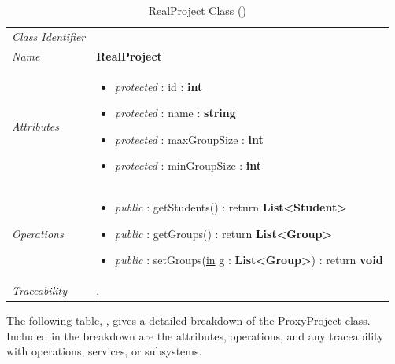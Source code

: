 \documentclass[12pt,letterpaper]{article}
\begin{document}
\begin{table}[H]
    \caption{RealProject Class ()} 
	\begin{tabu} to 
		\toprule
		Class Identifier &  \\
		Name & {\bf RealProject} \\
		Attributes & 
		\begin{minipage}[t]{\linewidth}
		    \begin{itemize}
		        \item \textit{protected} : id : {\bf int}
		        \item \textit{protected} : name : {\bf string}
		        \item \textit{protected} : maxGroupSize : {\bf int}
		        \item \textit{protected} : minGroupSize : {\bf int}
			\end{itemize}
	    \end{minipage} \\

		Operations &
		\begin{minipage}[t]{\linewidth}
			\begin{itemize}
			    \item {\it public} : getStudents() : return {\bf List<Student>}
			    \item {\it public} : getGroups() : return {\bf List<Group>}
			    \item {\it public} : setGroups(\underline{in} g : {\bf List<Group>}) : return {\bf void}
	        \end{itemize}
	    \end{minipage} \\
	    	Traceability & , \\
		\toprule
	\end{tabu}
\end{table}

\newpage{}
The following table, , gives a detailed breakdown of the ProxyProject class. Included in the breakdown are the attributes, operations, and any traceability with operations, services, or subsystems.
\end{document}

